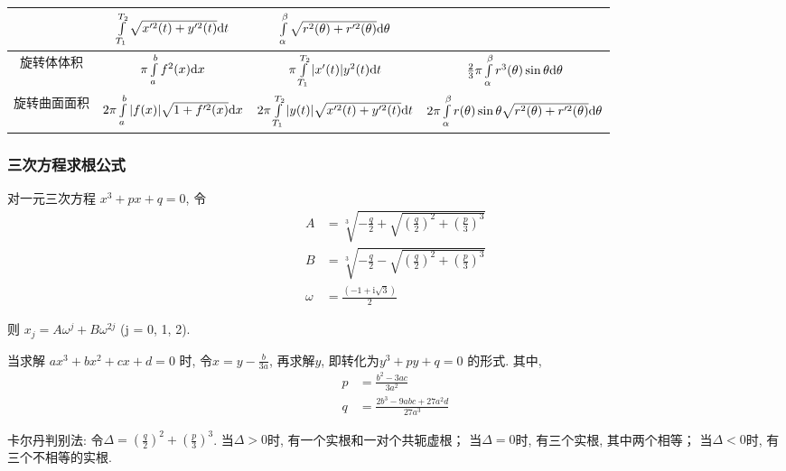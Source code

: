 \documentclass[landscape, twocolumn, 8pt, a4paper, twoside]{extarticle}
\begin{document}
\begin{itemize}
\begin{tabular}{|c|c|c|c|}
      & $\int\limits_{T_1}^{T_2} \sqrt{x^{\prime 2}(t) + y^{\prime 2}(t)} {\rm d}t$
      & $\int\limits_{\alpha}^{\beta} \sqrt{r^{2}(\theta) + r^{\prime 2}(\theta)} {\rm d}\theta$ \\
      \hline
      旋转体体积
      & $\pi\int\limits_{a}^{b} f^2(x) {\rm d}x$
      & $\pi\int\limits_{T_1}^{T_2} |x^\prime(t)| y^2(t) {\rm d}t$
      & $\frac{2}{3}\pi\int\limits_{\alpha}^{\beta}r^3(\theta)\sin\theta{\rm d}\theta$ \\
      \hline
      旋转曲面面积
      &$2\pi\int\limits_{a}^{b}|f(x)|\sqrt{1 + f^{\prime 2}(x)} {\rm d}x$
      &$2\pi\int\limits_{T_1}^{T_2}|y(t)|\sqrt{x^{\prime 2}(t) + y^{\prime 2}(t)}{\rm d}t$
      &$2\pi\int\limits_{\alpha}^{\beta}r(\theta)\sin\theta\sqrt{r^2(\theta)+r^{\prime2}(\theta)}{\rm d}\theta$\\
      \hline
      \end{tabular}
    \end{itemize}
    \subsubsection{三次方程求根公式}
      对一元三次方程
      $x ^ 3 + px + q = 0$,
      令
      \begin{align*}
        A &= \sqrt[3]{-\frac{q}{2}+\sqrt{(\frac{q}{2})^2+(\frac{p}{3})^3}} \\
        B &= \sqrt[3]{-\frac{q}{2}-\sqrt{(\frac{q}{2})^2+(\frac{p}{3})^3}} \\ 
        \omega &= \frac{(-1 + \mathrm{i} \sqrt{3})}{2}
      \end{align*}
      
      则 $x_j = A\omega^{j} + B\omega^{2j}$ (j = 0, 1, 2).
      
      当求解 $ax ^ 3 + bx ^ 2 + cx + d = 0$ 时, 令$x = y - \frac{b}{3a}$, 再求解$y$, 即转化为$y^3 + py + q = 0$ 的形式. 
      其中, 
      \begin{align*}
        p &= \frac{b^2 - 3ac}{3a^2} \\
        q &= \frac{2b ^ 3 - 9 abc + 27 a ^ 2 d}{27 a ^ 3}
      \end{align*}

      卡尔丹判别法: 
      令$\Delta = (\frac{q}{2}) ^ 2 + (\frac{p}{3}) ^ 3$. 
      当$\Delta > 0$时, 有一个实根和一对个共轭虚根；
      当$\Delta = 0$时, 有三个实根, 其中两个相等；
      当$\Delta < 0$时, 有三个不相等的实根. 
    
\end{document}
